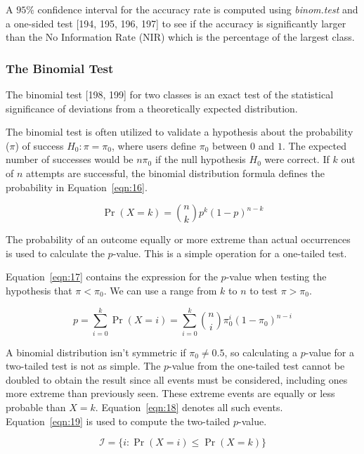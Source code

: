 \documentclass[sn-mathphys-num]{sn-jnl}%
\begin{document}
A $95\%$ confidence interval for the accuracy rate is computed using \textit{binom.test} and a one-sided test [194, 195, 196, 197] to see if the accuracy is significantly larger than the No Information Rate (NIR) which is the percentage of the largest class.

\subsubsection{The Binomial Test}

The binomial test [198, 199] for two classes is an exact test of the statistical significance of deviations from a theoretically expected distribution.

The binomial test is often utilized to validate a hypothesis about the probability ($\pi$) of success $H_{0}\colon \pi =\pi_{0}$, where users define $\pi_{0}$ between $0$ and $1$. The expected number of successes would be $n\pi_{0}$ if the null hypothesis $H_{0}$ were correct. If $k$ out of $n$ attempts are successful, the binomial distribution formula defines the probability in Equation~\ref{eqn:16}.

\begin{equation}
	\Pr(X=k)={\binom{n}{k}}p^{k}(1-p)^{n-k}
	\label{eqn:16}
\end{equation}

The probability of an outcome equally or more extreme than actual occurrences is used to calculate the $p$-value. This is a simple operation for a one-tailed test. 

Equation~\ref{eqn:17} contains the expression for the $p$-value when testing the hypothesis that $\pi <\pi_{0}$. We can use a range from $k$ to $n$ to test $\pi >\pi_{0}$.

\begin{equation}
	p=\sum_{i=0}^{k}\Pr(X=i)=\sum_{i=0}^{k}{\binom{n}{i}}\pi_{0}^{i}(1-\pi_{0})^{n-i}
	\label{eqn:17}
\end{equation}

A binomial distribution isn't symmetric if $\pi_{0}\neq 0.5$, so calculating a $p$-value for a two-tailed test is not as simple. The $p$-value from the one-tailed test cannot be doubled to obtain the result since all events must be considered, including ones more extreme than previously seen. These extreme events are equally or less probable than $X=k$. Equation~\ref{eqn:18} denotes all such events. Equation~\ref{eqn:19} is used to compute the two-tailed $p$-value.

\begin{equation}
	{\mathcal{I}}=\{i\colon \Pr(X=i)\leq \Pr(X=k)\}
	\label{eqn:18}
\end{equation}
\end{document}
